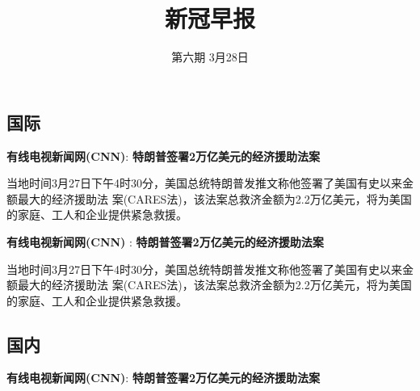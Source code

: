 \documentclass[11,]{article}
\title{\textcolor{glaucous}{新冠早报}}
\author{\textcolor{glaucous}{第六期 3月28日}}
\date{}
\begin{document}
\maketitle

\newcommand{\resheading}[1]{%
  \noindent\fcolorbox{lavenderblush}{lavenderblush}{\makebox[\dimexpr\textwidth-2\fboxsep-2\fboxrule][l]{\textbf{~#1}}}%
}

\pagestyle{fancyplain}

%
  \noindent{}%

\hypertarget{section}{%
\subsection{\texorpdfstring{\textcolor{glaucous}{国际}}{}}\label{section}}

\textbf{\textcolor{glaucous}{有线电视新闻网(CNN)}}:
\textbf{特朗普签署2万亿美元的经济援助法案}

当地时间3月27日下午4时30分，美国总统特朗普发推文称他签署了美国有史以来金额最大的经济援助法
案(CARES法)，该法案总救济金额为2.2万亿美元，将为美国的家庭、工人和企业提供紧急救援。

\textbf{\textcolor{glaucous}{有线电视新闻网(CNN)}} :
\textbf{特朗普签署2万亿美元的经济援助法案}

当地时间3月27日下午4时30分，美国总统特朗普发推文称他签署了美国有史以来金额最大的经济援助法
案(CARES法)，该法案总救济金额为2.2万亿美元，将为美国的家庭、工人和企业提供紧急救援。

\hypertarget{section-1}{%
\subsection{\texorpdfstring{\textcolor{glaucous}{国内}}{}}\label{section-1}}

\textbf{\textcolor{glaucous}{有线电视新闻网(CNN)}}:
\textbf{特朗普签署2万亿美元的经济援助法案}
\end{document}
